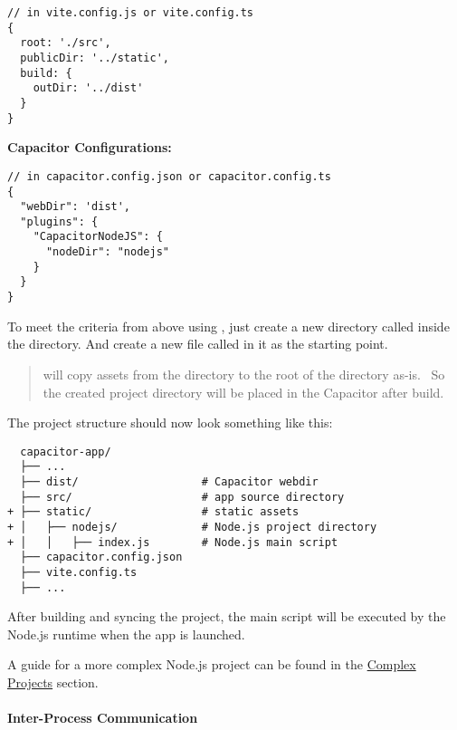 \begin{verbatim}
// in vite.config.js or vite.config.ts
{
  root: './src',
  publicDir: '../static',
  build: {
    outDir: '../dist'
  }
}
\end{verbatim}

\textbf{Capacitor Configurations:}

\begin{verbatim}
// in capacitor.config.json or capacitor.config.ts
{
  "webDir": 'dist',
  "plugins": {
    "CapacitorNodeJS": {
      "nodeDir": "nodejs"
    }
  }
}
\end{verbatim}

\vspace{1em}

To meet the criteria from above using , just create a new directory called  inside the  directory.
And create a new file called  in it as the starting point.

\begin{quote}
   will copy assets from the  directory to the root of the  directory as-is.~\cite{vite}
  So the created  project directory will be placed in the Capacitor  after build.
\end{quote}

\vspace{1em}

The project structure should now look something like this:

\begin{verbatim}
  capacitor-app/
  ├── ...
  ├── dist/                   # Capacitor webdir
  ├── src/                    # app source directory
+ ├── static/                 # static assets
+ │   ├── nodejs/             # Node.js project directory
+ │   │   ├── index.js        # Node.js main script
  ├── capacitor.config.json
  ├── vite.config.ts
  ├── ...
\end{verbatim}

\vspace{1em}

After building and syncing the project, the main script will be executed by the Node.js runtime when the app is launched.

A guide for a more complex Node.js project can be found in the \hyperref[sec:Capacitor-NodeJS:ComplexProjects]{Complex Projects} section.

\paragraph{Inter-Process Communication}
\label{sec:Capacitor-NodeJS:InterprocessCommunication}

